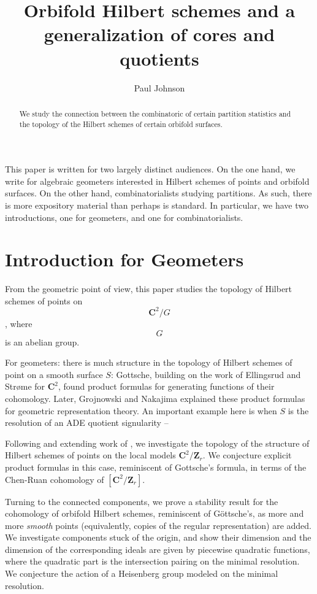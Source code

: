 \documentclass{amsart}[12pt]
\theoremstyle{definition}
\newcommand{\Z}{\mathbf{Z}}
\newcommand{\C}{\mathbf{C}}
\begin{document}
\begin{abstract}
We study the connection between the combinatoric of certain partition statistics and the topology of the Hilbert schemes of certain orbifold surfaces.
\end{abstract}


\title{Orbifold Hilbert schemes and a generalization of cores and quotients}


\author{Paul Johnson}
\address{University of Sheffield}


\maketitle
\setcounter{tocdepth}{2}
\tableofcontents
This paper is written for two largely distinct audiences.  On the one hand, we write for algebraic geometers interested in Hilbert schemes of points and orbifold surfaces.  On the other hand, combinatorialists studying partitions.  As such, there is more expository material than perhaps is standard.  In particular, we have two introductions, one for geometers, and one for combinatorialists.


\section{Introduction for Geometers}
\cite{GLMpower}

From the geometric point of view, this paper studies the topology of Hilbert schemes of points on $$\C^2/G$$, where $$G$$ is an abelian group.  


For geometers: there is much structure in the topology of Hilbert schemes of point on a smooth surface $S$: Gottsche, building on the work of Ellingsrud and Str\o me for $\C^2$, found product formulas for generating functions of their cohomology.  Later, Grojnowski and Nakajima \cite{grojnowski, nakajimaheisenberg} explained these product formulas for geometric representation theory.  An important example here is when $S$ is the resolution of an ADE quotient signularity -- 

Following and extending work of , we investigate the topology of the structure of Hilbert schemes of points on the local models $\C^2/\Z_r$.  We conjecture explicit product formulas in this case, reminiscent of Gottsche's formula, in terms of the Chen-Ruan cohomology of $[\C^2/\Z_r]$.  

Turning to the connected components, we prove a stability result for the cohomology of orbifold Hilbert schemes, reminiscent of G\"ottsche's, as more and more \emph{smooth} points (equivalently, copies of the regular representation) are added.  We investigate components stuck of the origin, and show their dimension and the dimension of the corresponding ideals are given by piecewise quadratic functions, where the quadratic part is the intersection pairing on the minimal resolution.  We conjecture the action of a Heisenberg group modeled on the minimal resolution.
\end{document}
